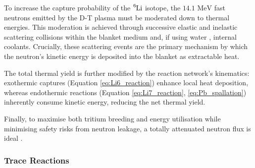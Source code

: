 \documentclass[11pt]{article}
\begin{document}
To increase the capture probability of the $\ce{^{6}Li}$ isotope, the $14.1 \text{ MeV}$ fast
neutrons emitted by the D-T plasma must be moderated down to thermal energies. This moderation is
achieved through successive elastic and inelastic scattering collisions within the blanket medium
and, if using water \citep{khan_mphys_sem1}, internal coolants. Crucially, these scattering events
are the primary mechanism by which the neutron's kinetic energy is deposited into the blanket as
extractable heat.

The total thermal yield is further modified by the reaction network's kinematics:
exothermic captures (Equation \ref{eq:Li6_reaction}) enhance local heat deposition, whereas
endothermic reactions (Equation \ref{eq:Li7_reaction}, \ref{eq:Pb_spallation}) inherently consume
kinetic energy, reducing the net thermal yield.

Finally, to maximise both tritium breeding and energy utilisation while minimising safety risks from
neutron leakage, a totally attenuated neutron flux is ideal \citep{khan_mphys_sem1}.

\subsubsection{Trace Reactions}
\label{sec:trace_reactions}
\end{document}
